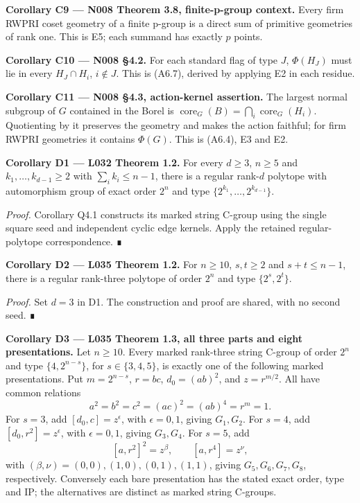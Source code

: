 \documentclass[
  10pt,
  letterpaper,
]{article}
\begin{document}
\textbf{Corollary C9 --- N008 Theorem 3.8, finite-p-group context.}
Every firm RWPRI coset geometry of a finite p-group is a direct sum of
primitive geometries of rank one. This is E5; each summand has exactly
\(p\) points.

\textbf{Corollary C10 --- N008 §4.2.} For each standard flag of type
\(J\), \(\Phi(H_J)\) must lie in every \(H_J\cap H_i\), \(i\notin J\).
This is (A6.7), derived by applying E2 in each residue.

\textbf{Corollary C11 --- N008 §4.3, action-kernel assertion.} The
largest normal subgroup of \(G\) contained in the Borel is
\(\operatorname{core}_G(B)=\bigcap_i\operatorname{core}_G(H_i)\).
Quotienting by it preserves the geometry and makes the action faithful;
for firm RWPRI geometries it contains \(\Phi(G)\). This is (A6.4), E3
and E2.

\textbf{Corollary D1 --- L032 Theorem 1.2.} For every \(d\ge3\),
\(n\ge5\) and \(k_1,\ldots,k_{d-1}\ge2\) with \(\sum_i k_i\le n-1\),
there is a regular rank-\(d\) polytope with automorphism group of exact
order \(2^n\) and type \(\{2^{k_1},\ldots,2^{k_{d-1}}\}\).

\emph{Proof.} Corollary Q4.1 constructs its marked string C-group using
the single square seed and independent cyclic edge kernels. Apply the
retained regular-polytope correspondence. ∎

\textbf{Corollary D2 --- L035 Theorem 1.2.} For \(n\ge10\), \(s,t\ge2\)
and \(s+t\le n-1\), there is a regular rank-three polytope of order
\(2^n\) and type \(\{2^s,2^t\}\).

\emph{Proof.} Set \(d=3\) in D1. The construction and proof are shared,
with no second seed. ∎

\textbf{Corollary D3 --- L035 Theorem 1.3, all three parts and eight
presentations.} Let \(n\ge10\). Every marked rank-three string C-group
of order \(2^n\) and type \(\{4,2^{n-s}\}\), for \(s\in\{3,4,5\}\), is
exactly one of the following marked presentations. Put \(m=2^{n-s}\),
\(r=bc\), \(d_0=(ab)^2\), and \(z=r^{m/2}\). All have common relations
\[
a^2=b^2=c^2=(ac)^2=(ab)^4=r^m=1.
\] For \(s=3\), add \([d_0,c]=z^\epsilon\), with \(\epsilon=0,1\),
giving \(G_1,G_2\). For \(s=4\), add \([d_0,r^2]=z^\epsilon\), with
\(\epsilon=0,1\), giving \(G_3,G_4\). For \(s=5\), add \[
[a,r^2]^2=z^\beta,\qquad [a,r^4]=z^\nu,
\] with \((\beta,\nu)=(0,0),(1,0),(0,1),(1,1)\), giving
\(G_5,G_6,G_7,G_8\), respectively. Conversely each bare presentation has
the stated exact order, type and IP; the alternatives are distinct as
marked string C-groups.
\end{document}
